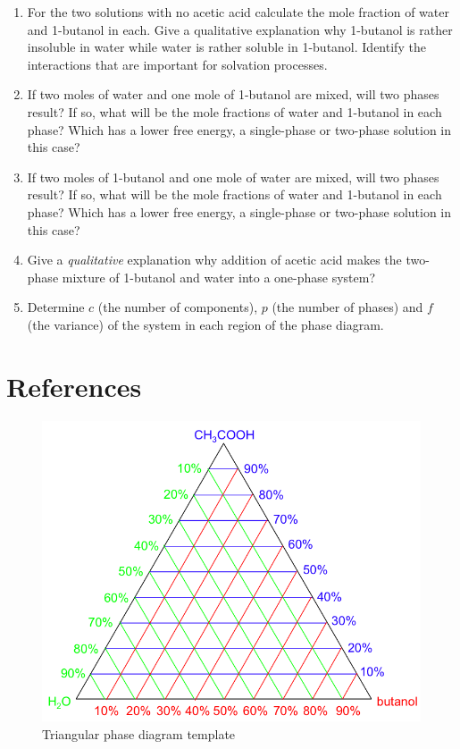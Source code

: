 \documentclass[byrevtex,amssymb,aps,pra,floatfix,letterpaper]{revtex4}
\begin{document}
\begin{enumerate}
\item For the two solutions with no acetic acid calculate the mole fraction of water and 1-butanol in each. Give a qualitative explanation why 1-butanol is rather insoluble in water while water is rather soluble in 1-butanol. Identify the interactions that are important for solvation processes.
\item If two moles of water and one mole of 1-butanol are mixed, will two phases result? If so, what will be the mole fractions of water and 1-butanol in each phase? Which has a lower free energy, a single-phase or two-phase solution in this case?
\item If two moles of 1-butanol and one mole of water are mixed, will two phases result? If so, what will be the mole fractions of water and 1-butanol in each phase? Which has a lower free energy, a single-phase or two-phase solution in this case?
\item Give a \textit{qualitative} explanation why addition of acetic acid makes the two-phase mixture of 1-butanol and water into a one-phase system?
\item Determine $c$ (the number of components), $p$ (the number of phases) and $f$ (the variance) of the system in each region of the phase diagram.
\end{enumerate}

\section{References}

\vspace{-1cm}



\newpage
\begin{figure}[!htp]
\begin{center}
\includegraphics[scale=0.8]{fig4}
\caption{Triangular phase diagram template}
\label{fig4}
\end{center}
\end{figure}
\end{document}
